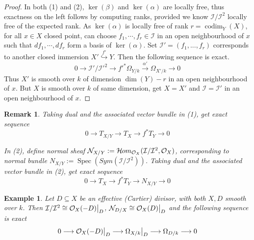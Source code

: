 \documentclass{ctexart}
\newtheorem{remark}{Remark}[section]
\newtheorem{example}{Example}[section]
\newcommand{\codim}{\operatorname{codim}}
\newcommand{\sheafhom}{\mathcal{H}\kern -.5pt om}
\newcommand{\spec}{\operatorname{Spec}}
\begin{document}
\begin{proof}
    In both (1) and (2), $\ker(\beta)$ and $\ker(\alpha)$ are locally free, thus exactness on the left follows by computing ranks, provided we know $\mathcal{I}/\mathcal{I}^{2}$ locally free of the expected rank.
    As $\ker(\alpha)$ is locally free of rank $r = \codim_{Y}(X)$, for all $x\in X$ closed point, can choose $f_{1}, \cdots, f_{r}\in \mathcal{I}$ in an open neighbourhood of $x$ such that $df_{1}, \cdots, df_{r}$ form a basis of $\ker(\alpha)$.
    Set $\mathcal{I}' = (f_{1}, ..., f_{r})$ corresponds to another closed immersion $X' \overset{f'}{\hookrightarrow} Y$.
    Then the following sequence is exact.
    \begin{equation*}
        0 \longrightarrow \mathcal{I}'/{\mathcal{I}'}^{2} \longrightarrow {f'}^{\ast}\Omega_{Y/k} \overset{\alpha'}{\longrightarrow} \Omega_{X'/k} \longrightarrow 0
    \end{equation*}
    Thus $X'$ is smooth over $k$ of dimension $\dim(Y) - r$ in an open neighbourhood of $x$.
    But $X$ is smooth over $k$ of same dimension, get $X = X'$ and $\mathcal{I} = \mathcal{I}'$ in an open neighbourhood of $x$.
\end{proof}
\begin{remark}
    Taking dual and the associated vector bundle in (1), get exact sequence
    \begin{equation*}
        0 \longrightarrow T_{X/Y} \longrightarrow T_{X} \longrightarrow f^{\ast}T_{Y} \longrightarrow 0
    \end{equation*}
    \par
    In (2), define normal sheaf $\mathcal{N}_{X/Y} := \sheafhom_{\mathcal{O}_{X}}(\mathcal{I}/\mathcal{I}^{2}, \mathcal{O}_{X})$, corresponding to normal bundle $N_{X/Y} := \spec(Sym(\mathcal{I}/\mathcal{I}^{2}))$.
    Taking dual and the associated vector bundle in (2), get exact sequence
    \begin{equation*}
        0 \longrightarrow T_{X} \longrightarrow f^{\ast}T_{Y} \longrightarrow N_{X/Y} \longrightarrow 0
    \end{equation*}
\end{remark}
\begin{example}
    Let $D \subseteq X$ be an effective (Cartier) divisor, with both $X,D$ smooth over $k$.
    Then $\mathcal{I}/\mathcal{I}^{2} \cong \mathcal{O}_{X}(-D)\big{|}_{D}$, $\mathcal{N}_{D/X} \cong \mathcal{O}_{X}(D)\big{|}_{D}$ and the following sequence is exact
    \begin{equation*}
        0 \longrightarrow \mathcal{O}_{X}(-D)\big{|}_{D} \longrightarrow \Omega_{X/k}\big{|}_{D} \longrightarrow \Omega_{D/k} \longrightarrow 0
    \end{equation*}
\end{example}
\end{document}
